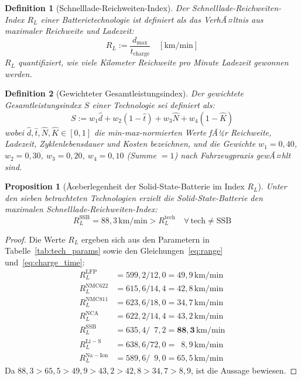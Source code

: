﻿\documentclass[12pt,a4paper]{article}
\newtheorem{proposition}[theorem]{Proposition}
\newtheorem{definition}{Definition}[section]
\begin{document}
	\begin{definition}[Schnelllade-Reichweiten-Index]
		Der \emph{Schnelllade-Reichweiten-Index} $R_L$ einer Batterietechnologie
		ist definiert als das VerhÃ¤ltnis aus maximaler Reichweite und
		Ladezeit:
		\begin{equation}
			R_L := \frac{d_{\mathrm{max}}}{t_{\mathrm{charge}}}
			\quad [\mathrm{km/min}]
			\label{eq:rl_index}
		\end{equation}
		$R_L$ quantifiziert, wie viele Kilometer Reichweite pro Minute
		Ladezeit gewonnen werden.
	\end{definition}

	\begin{definition}[Gewichteter Gesamtleistungsindex]
		Der \emph{gewichtete Gesamtleistungsindex} $S$ einer Technologie
		sei definiert als:
		\begin{equation}
			S := w_1 \hat{d} + w_2 (1-\hat{t}) + w_3 \hat{N} + w_4 (1-\hat{K})
			\label{eq:total_score}
		\end{equation}
		wobei $\hat{d}, \hat{t}, \hat{N}, \hat{K} \in [0,1]$ die
		min-max-normierten Werte fÃ¼r Reichweite, Ladezeit, Zyklenlebensdauer
		und Kosten bezeichnen, und die Gewichte
		$w_1=0{,}40$, $w_2=0{,}30$, $w_3=0{,}20$, $w_4=0{,}10$
		(Summe $= 1$) nach Fahrzeugpraxis gewÃ¤hlt sind.
	\end{definition}

	\begin{proposition}[Ãœberlegenheit der Solid-State-Batterie im Index $R_L$]
		\label{prop:ssbrl}
		Unter den sieben betrachteten Technologien erzielt die
		Solid-State-Batterie den maximalen Schnelllade-Reichweiten-Index:
		\begin{equation}
			R_L^{\mathrm{SSB}} = 88{,}3\,\mathrm{km/min} >
			R_L^{\mathrm{tech}} \quad \forall\, \mathrm{tech} \neq \mathrm{SSB}
		\end{equation}
	\end{proposition}

	\begin{proof}
		Die Werte $R_L$ ergeben sich aus den Parametern in
		Tabelle~\ref{tab:tech_params} sowie den
		Gleichungen~\eqref{eq:range} und~\eqref{eq:charge_time}:
		\begin{align*}
			R_L^{\mathrm{LFP}}   &= 599{,}2 / 12{,}0 = 49{,}9\,\mathrm{km/min} \\
			R_L^{\mathrm{NMC622}}&= 615{,}6 / 14{,}4 = 42{,}8\,\mathrm{km/min} \\
			R_L^{\mathrm{NMC811}}&= 623{,}6 / 18{,}0 = 34{,}7\,\mathrm{km/min} \\
			R_L^{\mathrm{NCA}}   &= 622{,}2 / 14{,}4 = 43{,}2\,\mathrm{km/min} \\
			R_L^{\mathrm{SSB}}   &= 635{,}4 / \phantom{0}7{,}2 = \mathbf{88{,}3}\,\mathrm{km/min} \\
			R_L^{\mathrm{Li-S}}  &= 638{,}6 / 72{,}0 = \phantom{0}8{,}9\,\mathrm{km/min} \\
			R_L^{\mathrm{Na-Ion}}&= 589{,}6 / \phantom{0}9{,}0 = 65{,}5\,\mathrm{km/min}
		\end{align*}
		Da $88{,}3 > 65{,}5 > 49{,}9 > 43{,}2 > 42{,}8 > 34{,}7 > 8{,}9$,
		ist die Aussage bewiesen.
	\end{proof}
\end{document}

